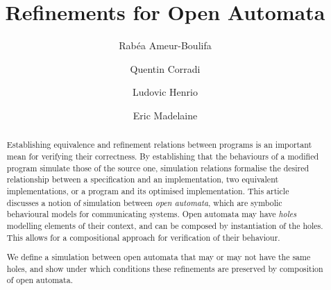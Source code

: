 \documentclass[runningheads]{llncs}
\begin{document}
%
\title{Refinements for Open Automata}



%
%
\author{
Rabéa Ameur-Boulifa \and
Quentin Corradi \and
Ludovic Henrio  \and
Eric Madelaine }
%
%
%
\maketitle              %
%
\begin{abstract}

Establishing equivalence and refinement relations between programs is an important mean for 
verifying their correctness. By establishing that the
behaviours of a modified program simulate those of the source one, simulation relations formalise the desired relationship between a specification and an implementation, 
 two equivalent implementations, or a program and its optimised implementation.
This article discusses a notion of simulation between \emph{open automata}, which are symbolic
behavioural models for communicating systems. 
Open automata may have \emph{holes} modelling elements of their
context, and can be composed by instantiation of the holes. This allows for a compositional approach for
verification of their behaviour.

We define a simulation between open automata that may or may not have the same holes, and 
show under which conditions these refinements are preserved by composition of open automata. 


\end{abstract}
%
%
%
\end{document}
